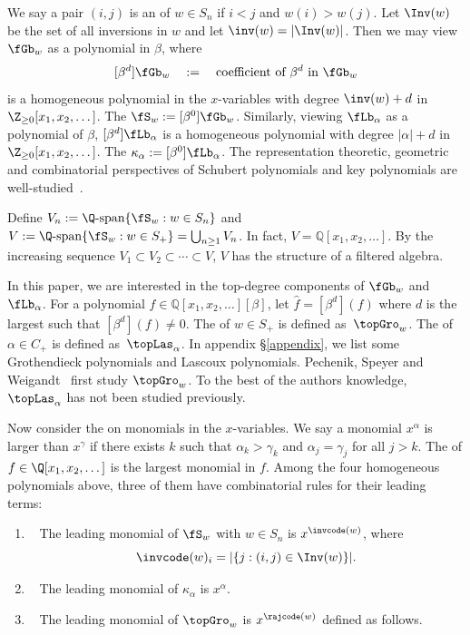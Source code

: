 We say a pair $(i,j)$ is an 
of $w \in S_n$ if $i < j$ and $w(i) > w(j)$. 
Let $\Inv(w)$ be the set of all inversions in $w$
and let $\inv(w) = |\Inv(w)|$.
Then we may view $\fGb_w$ as a polynomial in $\beta$, where
$$
[\beta^d] \fGb_w \quad := \quad \textrm{coefficient of $\beta^d$ in $\fGb_w$}
$$
is a homogeneous polynomial in the $x$-variables with degree 
$\inv(w) + d$ in $\Z_{\geq 0}[x_1,x_2,\dots]$.
The  $\fS_w := [\beta^0]\fGb_w$.
Similarly, viewing $\fLb_\alpha$ as a polynomial of $\beta$,
$[\beta^d] \fLb_\alpha$ is a homogeneous polynomial with degree
$|\alpha| + d$ in $\Z_{\geq 0}[x_1,x_2,\dots]$.
The  $\kappa_\alpha := [\beta^0]\fLb_\alpha$.
The representation theoretic, geometric and combinatorial perspectives of Schubert polynomials and key polynomials
are well-studied~\cite{De,LS1,BJS}.

Define $V_n :=  \Q\textrm{-span}\{\fS_w: w \in S_n\}$ 
and $V :=  \Q\textrm{-span}\{\fS_w: w \in S_+\} = \bigcup_{n \geq 1} V_n$.
In fact, $V = \mathbb{Q}[x_1, x_2, \dots]$. 
By the increasing sequence 
$V_1 \subset V_2 \subset \cdots \subset V$,
$V$ has the structure of a filtered algebra. 


In this paper, we are interested in the top-degree 
components of $\fGb_w$ and $\fLb_\alpha$. 
For a polynomial $f \in \mathbb{Q}[x_1, x_2, \dots][\beta]$,
let $\widehat{f} = [\beta^d](f)$ where $d$ is the largest such that 
$[\beta^d](f) \neq 0$.
The  of $w \in S_+$
is defined as~$\topGro_w$.
The  of $\alpha \in C_+$
is defined as~$\topLas_\alpha$. In appendix \S\ref{appendix}, we list some Grothendieck polynomials and Lascoux polynomials.
Pechenik, Speyer and Weigandt~\cite{PSW} first study $\topGro_w$.
To the best of the authors knowledge, 
$\topLas_\alpha$ has not been studied previously. 

Now consider the  
on monomials in the $x$-variables.
We say a monomial $x^\alpha$ is larger than $x^\gamma$
if there exists $k$ such that $\alpha_k > \gamma_k$ and 
$\alpha_j = \gamma_j$ for all $j > k$.
The  of $f \in \Q[x_1, x_2, \dots]$
is the largest monomial in $f$. 
Among the four homogeneous
polynomials above,
three of them have combinatorial rules for their leading terms:
\begin{enumerate}
\item~\cite{BJS} The leading monomial of $\fS_w$ with $w \in S_n$
is $x^{\invcode(w)}$,
where $$\invcode(w)_i = |\{j: (i,j) \in \Inv(w)\}|.$$
\item~\cite{LS2} The leading monomial of $\kappa_\alpha$ is $x^\alpha$.
\item~\cite{PSW} The leading monomial of $\topGro_w$
is $x^{\rajcode(w)}$ defined as follows.
\end{enumerate}

